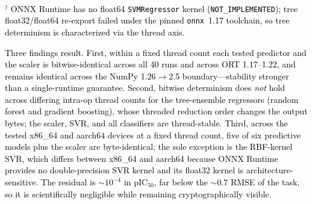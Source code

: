 \documentclass[conference]{IEEEtran}
\newcommand{\rev}[2]{#2}
\begin{document}
\begin{table}[!htbp]
\centering
\caption{\textcolor{black}{Per-model determinism
characterization: within-configuration (40 runs), across
intra-op thread counts, across ONNX Runtime 1.17--1.22, and
dtype residual versus the sklearn float64 reference.}}
\label{tab:determinism-detail}
\\[2pt]
{\footnotesize \textcolor{black}{$^\dagger$ ONNX Runtime has no
float64 \texttt{SVMRegressor} kernel (\texttt{NOT\_IMPLEMENTED});
tree float32/float64 re-export failed under the pinned
\texttt{onnx}~1.17 toolchain, so tree determinism is
characterized via the thread axis.}}
\end{table}

\textcolor{black}{Three findings result. First, within a fixed
thread count \rev{R2.1}{each tested predictor and the scaler is bitwise-identical} across all 40
runs and across ORT 1.17--1.22, and remains identical across
the NumPy 1.26$\rightarrow$2.5 boundary---stability stronger
than a single-runtime guarantee. Second, bitwise determinism
does \emph{not} hold across differing intra-op thread counts
for the tree-ensemble regressors (random forest and gradient
boosting), whose threaded reduction order changes the output
bytes; the scaler, SVR, and all classifiers are thread-stable.
Third, across \rev{R1.1}{the tested x86\_64 and aarch64 devices} at a fixed thread count,
\rev{R1.1, R2.1}{five of six predictive models plus the scaler are byte-identical}; the sole exception is
the RBF-kernel SVR, which differs between x86\_64 and aarch64
because ONNX Runtime provides no double-precision SVR kernel
and its float32 kernel is architecture-sensitive. The residual
is $\sim$$10^{-4}$ in pIC$_{50}$, far below the $\sim$0.7 RMSE
of the task, so it is scientifically negligible while remaining
cryptographically visible.}
\end{document}

